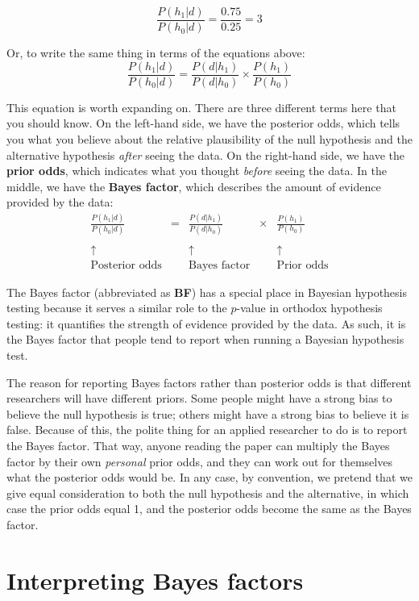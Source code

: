 \documentclass[
]{book}
\theoremstyle{definition}
\theoremstyle{definition}
\theoremstyle{definition}
\theoremstyle{definition}
\theoremstyle{remark}
\begin{document}
\[
\frac{P(h_1 | d)}{P(h_0 | d)} = \frac{0.75}{0.25} = 3
\]

Or, to write the same thing in terms of the equations above:
\[
\frac{P(h_1 | d)}{P(h_0 | d)} = \frac{P(d|h_1)}{P(d|h_0)} \times \frac{P(h_1)}{P(h_0)}
\]

This equation is worth expanding on. There are three different terms here that you should know. On the left-hand side, we have the posterior odds, which tells you what you believe about the relative plausibility of the null hypothesis and the alternative hypothesis \emph{after} seeing the data. On the right-hand side, we have the \textbf{prior odds}, which indicates what you thought \emph{before} seeing the data. In the middle, we have the \textbf{Bayes factor}, which describes the amount of evidence provided by the data:
\[
\begin{array}{ccccc}\displaystyle
\frac{P(h_1 | d)}{P(h_0 | d)} &=& \displaystyle\frac{P(d|h_1)}{P(d|h_0)} &\times& \displaystyle\frac{P(h_1)}{P(h_0)} \\[6pt] \\[-2pt]
\uparrow && \uparrow && \uparrow \\[6pt]
\mbox{Posterior odds} && \mbox{Bayes factor} && \mbox{Prior odds}
\end{array}
\]

The Bayes factor (abbreviated as \textbf{BF}) has a special place in Bayesian hypothesis testing because it serves a similar role to the \(p\)-value in orthodox hypothesis testing: it quantifies the strength of evidence provided by the data. As such, it is the Bayes factor that people tend to report when running a Bayesian hypothesis test.

The reason for reporting Bayes factors rather than posterior odds is that different researchers will have different priors. Some people might have a strong bias to believe the null hypothesis is true; others might have a strong bias to believe it is false. Because of this, the polite thing for an applied researcher to do is to report the Bayes factor. That way, anyone reading the paper can multiply the Bayes factor by their own \emph{personal} prior odds, and they can work out for themselves what the posterior odds would be. In any case, by convention, we pretend that we give equal consideration to both the null hypothesis and the alternative, in which case the prior odds equal 1, and the posterior odds become the same as the Bayes factor.

\hypertarget{interpreting-bayes-factors}{%
\section{Interpreting Bayes factors}\label{interpreting-bayes-factors}}
\end{document}
